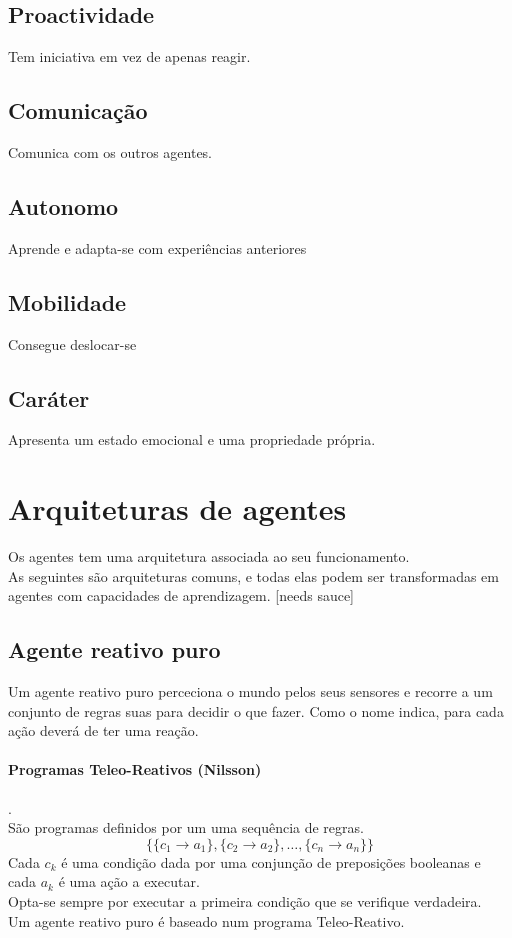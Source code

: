\documentclass[]{report}
\begin{document}
\subsection{Proactividade}
Tem iniciativa em vez de apenas reagir.
\subsection{Comunicação}
Comunica com os outros agentes.
\subsection{Autonomo}
Aprende e adapta-se com experiências anteriores
\subsection{Mobilidade}
Consegue deslocar-se
\subsection{Caráter}
Apresenta um estado emocional e uma propriedade própria.
\clearpage
\section{Arquiteturas de agentes}
Os agentes tem uma arquitetura associada ao seu funcionamento.\\
As seguintes são arquiteturas comuns, e todas elas podem ser transformadas em agentes com capacidades de aprendizagem. [needs sauce]
\subsection{Agente reativo puro}
Um agente reativo puro perceciona o mundo pelos seus sensores e recorre a um conjunto de regras suas para decidir o que fazer. Como o nome indica, para cada ação deverá de ter uma reação.
\paragraph{Programas Teleo-Reativos (Nilsson)}.\\
São programas definidos por um uma sequência de regras.
$$\{\{c_1 \rightarrow a_1\}, \{c_2 \rightarrow a_2\}, \dots, \{c_n \rightarrow a_n\}\}$$
Cada $c_k$ é uma condição dada por uma conjunção de preposições booleanas e cada $a_k$ é uma ação a executar.\\
Opta-se sempre por executar a primeira condição que se verifique verdadeira.\\[0.2cm]
Um agente reativo puro é baseado num programa Teleo-Reativo.
\end{document}
